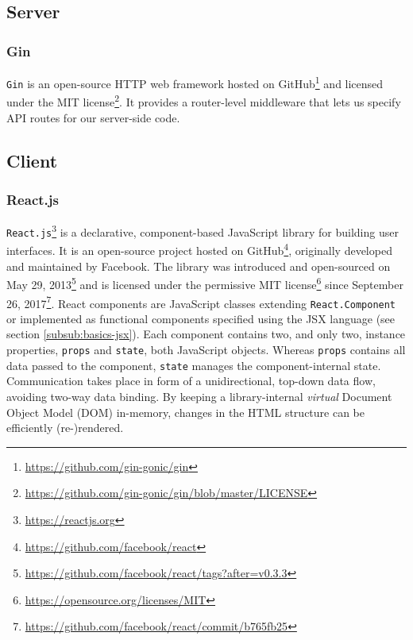\subsection{Server}
\label{sub:basics-server}

\subsubsection{Gin}
\label{subsub:basics-gin}

\texttt{Gin} is an open-source HTTP web framework hosted on GitHub\footnote{\url{https://github.com/gin-gonic/gin}} and licensed under the MIT license\footnote{\url{https://github.com/gin-gonic/gin/blob/master/LICENSE}}.
It provides a router-level middleware that lets us specify API routes for our server-side code.

\subsection{Client}
\label{sub:basics-client}

\subsubsection{React.js}
\label{subsub:basics-reactjs}

\texttt{React.js}\footnote{\url{https://reactjs.org}} is a declarative, component-based JavaScript library for building user interfaces. 
It is an open-source project hosted on GitHub\footnote{\url{https://github.com/facebook/react}}, originally developed and maintained by Facebook.
The library was introduced and open-sourced on May 29, 2013\footnote{\url{https://github.com/facebook/react/tags?after=v0.3.3}} and is licensed under the permissive MIT license\footnote{\url{https://opensource.org/licenses/MIT}} since September 26, 2017\footnote{\url{https://github.com/facebook/react/commit/b765fb25}}.
React components are JavaScript classes extending \texttt{React.Component} or implemented as functional components specified using the JSX language (see section \ref{subsub:basics-jsx}). Each component contains two, and only two, instance properties, \texttt{props} and \texttt{state}, both JavaScript objects. Whereas \texttt{props} contains all data passed to the component, \texttt{state} manages the component-internal state. Communication takes place in form of a unidirectional, top-down data flow, avoiding two-way data binding. By keeping a library-internal \textit{virtual} Document Object Model (DOM) in-memory, changes in the HTML structure can be efficiently (re-)rendered.

